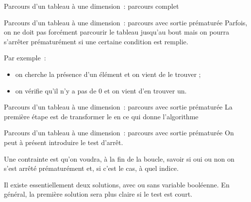 \begin{frame}{Parcours d'un tableau à une dimension~: parcours complet}
\end{frame}

\begin{frame}{Parcours d'un tableau à une dimension~: parcours avec sortie prématurée}
	Parfois, on ne doit pas forcément parcourir le tableau jusqu'au bout
	mais on pourra s'arrêter prématurément si une certaine condition est remplie.
	
	\bigskip
	
	Par exemple~:
	\begin{itemize}
		\item on cherche la présence d'un élément et on vient de le trouver ;
		\item on vérifie qu'il n'y a pas de $0$ et on vient d'en trouver un.
	\end{itemize}
\end{frame}

\begin{frame}{Parcours d'un tableau à une dimension~: parcours avec sortie prématurée}
	La première étape est de transformer le  en 
	ce qui donne l'algorithme 

\end{frame}

\begin{frame}{Parcours d'un tableau à une dimension~: parcours avec sortie prématurée}
	On peut à présent introduire le test d'arrêt.
	
	Une contrainte est qu'on voudra, à la fin de la boucle, savoir
	si oui ou non on s'est arrêté prématurément et, si c'est le cas,
	à quel indice.
	
	\bigskip

	Il existe essentiellement deux solutions, avec ou sans variable booléenne.
	En général, la première solution sera plus claire si le test est court.
\end{frame}


